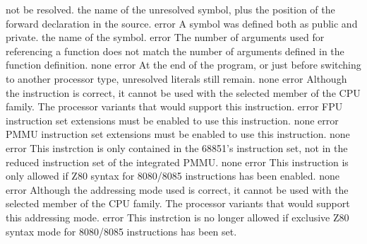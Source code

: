 \documentclass[12pt,twoside]{report}
\begin{document}
\begin{description}
{                not be resolved.}
               {the name of the unresolved symbol, plus the
                position of the forward declaration in the
                source.}
               {error}
               {A symbol was defined both as public and private.}
               {the name of the symbol.}
               {error}
               {The number of arguments used for referencing a function
                does not match the number of arguments defined in the
                function definition.}
               {none}
               {error}
               {At the end of the program, or just before switching to
                another processor type, unresolved literals still remain.}
               {none}
               {error}
               {Although the instruction is correct, it cannot be used with
                the selected member of the CPU family.}
               {The processor variants that would support this
                instruction.}
               {error}
               {FPU instruction set extensions must be enabled to
                use this instruction.}
               {none}
               {error}
               {PMMU instruction set extensions must be enabled
                to use this instruction.}
               {none}
               {error}
               {This instrction is only contained in the 68851's
                instruction set, not in the reduced instruction
                set of the integrated PMMU.}
               {none}
               {error}
               {This instruction is only allowed if Z80 syntax
                for 8080/8085 instructions has been enabled.}
               {none}
               {error}
               {Although the addressing mode used is correct, it cannot be
                used with the selected member of the CPU family.}
               {The processor variants that would support this
                addressing mode.}
               {error}
               {This instrction is no longer allowed if exclusive
                Z80 syntax mode for 8080/8085 instructions has been set.}

\end{description}
\end{document}
